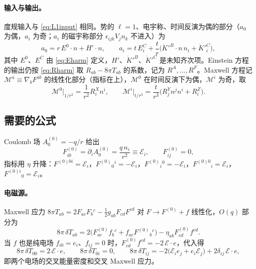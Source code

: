 \documentclass[11pt,a4paper]{ctexart}
\numberwithin{equation}{section}
\begin{document}
\paragraph{输入与输出。}度规输入与 \eqref{eq:L1input} 相同。势的 $\ell=1$、电宇称、时间反演为偶的部分（$a_0$ 为偶，$a_i$ 为奇；$a_i$ 的磁宇称部分 $\epsilon_{ijk}V_jn_k$ 不进入）为
\begin{equation}
a_0=r\,E^0\!\cdot n+H'\!\cdot n,\qquad
a_i=t\,E^C_i+\frac tr\big(\dot K'^B\!\cdot n\,n_i+\dot K'^C_i\big),
\label{eq:L2input}
\end{equation}
其中 $E^0$、$E^C$ 由 \eqref{eq:Eharm} 定义，$H'$、$\dot K'^B$、$\dot K'^C$ 是未知齐次项。Einstein 方程的输出仍按 \eqref{eq:Rharm} 取 $R_{ab}-8\pi T_{ab}$ 的系数，记为 $R^A,\dots,R^F$。Maxwell 方程记 $\mathcal M^a\equiv\nabla_bF^{ab}$ 的线性化部分（指标在上），$\mathcal M^0$ 在时间反演下为偶，$\mathcal M^i$ 为奇，取
\begin{equation}
\mathcal M^0\big|_{1/r^2}=\frac1{r^2}R^X_in^i,\qquad
\mathcal M^i\big|_{t/r^3}=\frac{t}{r^3}\big(R^Y_jn^jn^i+R^Z_i\big).
\label{eq:Mharm}
\end{equation}

\subsection{需要的公式}

Coulomb 场 $A^{(0)}_0=-q/r$ 给出
\begin{equation}
F^{(0)}_{i0}=\partial_iA^{(0)}_0=\frac{q\,n_i}{r^2}\equiv\mathcal E_i,\qquad F^{(0)}_{ij}=0 ,
\end{equation}
指标用 $\eta$ 升降：$F^{(0)0i}=\mathcal E_i$，$F^{(0)}{}_0{}^i=-\mathcal E_i$，$F^{(0)}{}_i{}^0=-\mathcal E_i$，$F^{(0)0}{}_i=\mathcal E_i$，$F^{(0)i}{}_0=\mathcal E_i$。

\paragraph{电磁源。}Maxwell 应力 $8\pi T_{ab}=2F_{ac}F_b{}^c-\tfrac12g_{ab}F_{cd}F^{cd}$ 对 $F\to F^{(0)}+f$ 线性化，$O(q)$ 部分为
\begin{equation}
8\pi\,\delta T_{ab}=2\big(F^{(0)}_{ac}f_b{}^c+f_{ac}F^{(0)}{}_b{}^c\big)-\eta_{ab}F^{(0)}_{cd}f^{cd}.
\label{eq:dT2}
\end{equation}
当 $f$ 也是纯电场 $f_{i0}=e_i$、$f_{ij}=0$ 时，$F^{(0)}_{cd}f^{cd}=-2\,\mathcal E\!\cdot e$，代入得
\begin{equation}
8\pi\,\delta T_{00}=2\,\mathcal E\!\cdot e,\qquad 8\pi\,\delta T_{0i}=0,\qquad
8\pi\,\delta T_{ij}=-2\big(\mathcal E_ie_j+e_i\mathcal E_j\big)+2\delta_{ij}\,\mathcal E\!\cdot e,
\label{eq:dT2E}
\end{equation}
即两个电场的交叉能量密度和交叉 Maxwell 应力。
\end{document}
